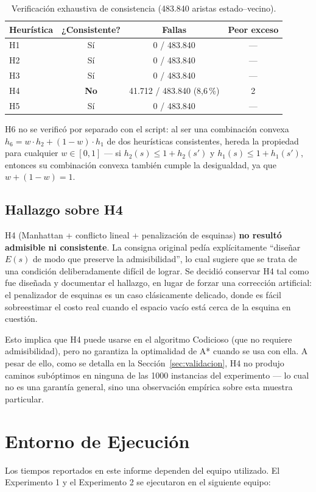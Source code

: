 \documentclass[11pt]{article}
\begin{document}
\begin{table}[H]
\centering
\caption{Verificación exhaustiva de consistencia (483.840 aristas estado--vecino).}
\begin{tabular}{lccc}
\toprule
Heurística & ¿Consistente? & Fallas & Peor exceso \\
\midrule
H1 & Sí & 0 / 483.840 & --- \\
H2 & Sí & 0 / 483.840 & --- \\
H3 & Sí & 0 / 483.840 & --- \\
H4 & \textbf{No} & 41.712 / 483.840 (8,6\,\%) & 2 \\
H5 & Sí & 0 / 483.840 & --- \\
\bottomrule
\end{tabular}
\end{table}

\noindent
H6 no se verificó por separado con el script: al ser una combinación convexa
$h_6 = w\cdot h_2 + (1-w)\cdot h_1$ de dos heurísticas consistentes, hereda la
propiedad para cualquier $w\in[0,1]$ --- si $h_2(s)\le 1+h_2(s')$ y
$h_1(s)\le 1+h_1(s')$, entonces su combinación convexa también cumple la
desigualdad, ya que $w+(1-w)=1$.

\subsection{Hallazgo sobre H4}
H4 (Manhattan + conflicto lineal + penalización de esquinas) \textbf{no
resultó admisible ni consistente}. La consigna original pedía explícitamente
``diseñar $E(s)$ de modo que preserve la admisibilidad'', lo cual sugiere que
se trata de una condición deliberadamente difícil de lograr. Se decidió
conservar H4 tal como fue diseñada y documentar el hallazgo, en lugar de
forzar una corrección artificial: el penalizador de esquinas es un caso
clásicamente delicado, donde es fácil sobreestimar el costo real cuando el
espacio vacío está cerca de la esquina en cuestión.

Esto implica que H4 puede usarse en el algoritmo Codicioso (que no requiere
admisibilidad), pero no garantiza la optimalidad de A* cuando se usa con
ella. A pesar de ello, como se detalla en la Sección~\ref{sec:validacion}, H4
no produjo caminos subóptimos en ninguna de las 1000 instancias del
experimento --- lo cual no es una garantía general, sino una observación
empírica sobre esta muestra particular.

\section{Entorno de Ejecución}
\label{sec:hardware}
Los tiempos reportados en este informe dependen del equipo utilizado. El
Experimento 1 y el Experimento 2 se ejecutaron en el siguiente equipo:
\end{document}
